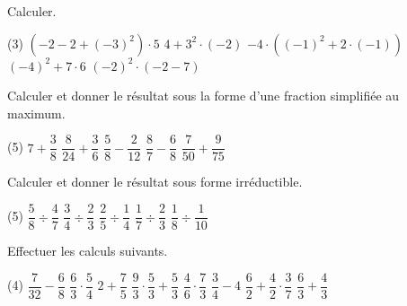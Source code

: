 \documentclass[a4paper,12pt]{report}
\begin{document}
\begin{auto}Calculer.

\begin{tasks}(3)
	\task $(-2 -2 + (-3)^2 ) \cdot 5$
	\task $4 + 3^2 \cdot (-2)$
	\task $-4 \cdot ( (-1)^2+2\cdot(-1))$
	\task $(-4)^2 +  7 \cdot 6$
	\task $(-2)^2 \cdot ( -2-7)$
\end{tasks}
\end{auto}

\begin{auto}Calculer et donner le résultat sous la forme d'une fraction simplifiée au maximum.

\begin{tasks}(5)
	\task $7+\dfrac{3}{8}$
	\task $\dfrac{8}{24}+\dfrac{3}{6}$
	\task $\dfrac{5}{8}-\dfrac{2}{12}$
	\task $\dfrac{8}{7}-\dfrac{6}{8}$
	\task $\dfrac{7}{50}+\dfrac{9}{75}$
\end{tasks}
\end{auto}

\begin{auto}Calculer et donner le résultat sous forme irréductible.

\begin{tasks}(5)
	\task $\dfrac{5}{8}\div\dfrac{4}{7}$
	\task $\dfrac{3}{4}\div\dfrac{2}{3}$
	\task $\dfrac{2}{5}\div\dfrac{1}{4}$
	\task $\dfrac{1}{7}\div\dfrac{2}{3}$
	\task $\dfrac{1}{8}\div\dfrac{1}{10}$
\end{tasks}
\end{auto}

\begin{auto}Effectuer les calculs suivants.

\begin{tasks}(4)
	\task $\dfrac{7}{32}-\dfrac{6}{8}$
	\task $\dfrac{6}{3} \cdot \dfrac{5}{4}$
	\task $2 + \dfrac{7}{5} $ 
	\task $\dfrac{9}{3} \cdot \dfrac{5}{3} + \dfrac{5}{3}$
	\task $\dfrac{4}{6} \cdot \dfrac{7}{3}$
	\task $\dfrac{3}{4}-4$
	\task $\dfrac{6}{2} + \dfrac{4}{2} \cdot \dfrac{3}{7}$ 
	\task $\dfrac{6}{3}+\dfrac{4}{3}$ 
\end{tasks}

\end{auto}
\end{document}
